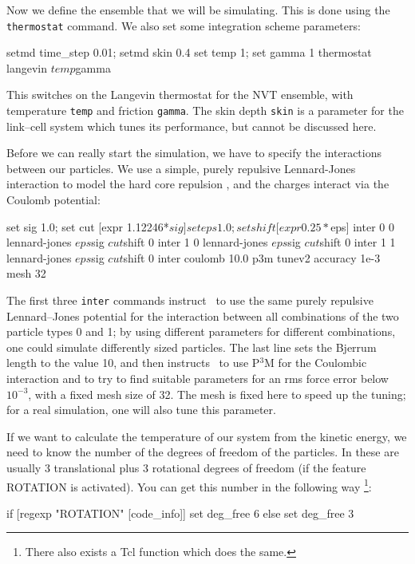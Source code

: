 Now we define the ensemble that we will be simulating. This is done
using the \verb|thermostat| command. We also set some integration
scheme parameters:
\begin{tclcode}
setmd time_step 0.01; setmd skin 0.4
set temp 1; set gamma 1
thermostat langevin $temp $gamma
\end{tclcode}
This switches on the Langevin thermostat for the NVT ensemble, with
temperature \verb|temp| and friction \verb|gamma|. The skin depth
\verb|skin| is a parameter for the link--cell system which tunes its
performance, but cannot be discussed here.

Before we can really start the simulation, we have to specify the
interactions between our particles.  We use a simple, purely repulsive
Lennard-Jones interaction to model the hard core repulsion
\citep{grest86a}, and the charges interact via the Coulomb potential:
\begin{tclcode}
set sig 1.0; set cut   [expr 1.12246*$sig]
set eps 1.0; set shift [expr 0.25*$eps]
inter 0 0 lennard-jones $eps $sig $cut $shift 0
inter 1 0 lennard-jones $eps $sig $cut $shift 0
inter 1 1 lennard-jones $eps $sig $cut $shift 0
inter coulomb 10.0 p3m tunev2 accuracy 1e-3 mesh 32
\end{tclcode}
The first three \verb|inter| commands instruct \es\ to use the same
purely repulsive Lennard--Jones potential for the interaction between
all combinations of the two particle types 0 and 1; by using different
parameters for different combinations, one could simulate differently
sized particles.  The last line sets the Bjerrum length to the value
10, and then instructs \es\ to use P$^3$M for the Coulombic
interaction and to try to find suitable parameters for an rms force
error below $10^{-3}$, with a fixed mesh size of 32. The mesh is fixed
here to speed up the tuning; for a real simulation, one will also tune
this parameter.

If we want to calculate the temperature of our system from the kinetic
energy, we need to know the number of the degrees of freedom of the
particles.  In \es these are usually 3 translational plus 3 rotational
degrees of freedom (if the feature ROTATION is activated). You can get
this number in the following way \footnote{There also exists a Tcl
  function  which does the same.}:

\begin{tclcode}
   if { [regexp "ROTATION" [code_info]] } { 
     set deg_free 6
   } else { set deg_free 3 }
\end{tclcode}

